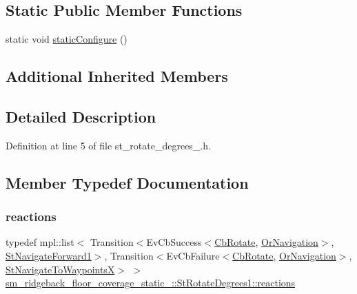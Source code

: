 \subsection*{Static Public Member Functions}
\begin{DoxyCompactItemize}
\item 
static void \hyperlink{structsm__ridgeback__floor__coverage__static__1_1_1StRotateDegrees1_a047856e8bf0eb8f4e5bad18baf343451}{static\+Configure} ()
\end{DoxyCompactItemize}
\subsection*{Additional Inherited Members}


\subsection{Detailed Description}


Definition at line 5 of file st\+\_\+rotate\+\_\+degrees\+\_.\+h.



\subsection{Member Typedef Documentation}
\mbox{\label{structsm__ridgeback__floor__coverage__static__1_1_1StRotateDegrees1_ab1b48d10574fef0590b07889884c45e6}} 
\subsubsection{\texorpdfstring{reactions}{reactions}}
{\footnotesize\ttfamily typedef mpl\+::list$<$ Transition$<$Ev\+Cb\+Success$<$\hyperlink{classcl__move__base__z_1_1CbRotate}{Cb\+Rotate}, \hyperlink{classsm__ridgeback__floor__coverage__static__1_1_1OrNavigation}{Or\+Navigation}$>$, \hyperlink{structsm__ridgeback__floor__coverage__static__1_1_1StNavigateForward1}{St\+Navigate\+Forward1}$>$, Transition$<$Ev\+Cb\+Failure$<$\hyperlink{classcl__move__base__z_1_1CbRotate}{Cb\+Rotate}, \hyperlink{classsm__ridgeback__floor__coverage__static__1_1_1OrNavigation}{Or\+Navigation}$>$, \hyperlink{structsm__ridgeback__floor__coverage__static__1_1_1StNavigateToWaypointsX}{St\+Navigate\+To\+WaypointsX}$>$ $>$ \hyperlink{structsm__ridgeback__floor__coverage__static__1_1_1StRotateDegrees1_ab1b48d10574fef0590b07889884c45e6}{sm\+\_\+ridgeback\+\_\+floor\+\_\+coverage\+\_\+static\+\_\+::\+St\+Rotate\+Degrees1\+::reactions}}



